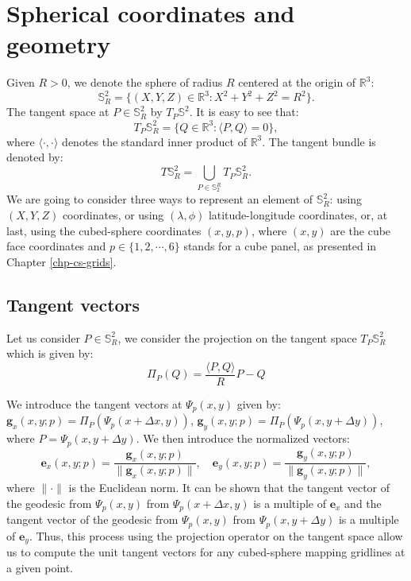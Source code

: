 \chapter{Spherical coordinates and geometry}
\label{anexo-sph}

Given $R>0$, we denote the sphere of radius $R$ 
centered at the origin of  $\mathbb{R}^3$:
\begin{equation*}
	\mathbb{S}^2_R = \{(X,Y,Z) \in \mathbb{R}^3: X^2 + Y^2 + Z^2 = R^2\}.
\end{equation*}
The tangent space at $P \in \mathbb{S}^2_R$ by $T_P \mathbb{S}^2$.
It is easy to see that:
\begin{equation*}
	T_P\mathbb{S}^2_R = \{Q \in \mathbb{R}^3: \langle P,Q\rangle = 0\},
\end{equation*}
where $\langle \cdot, \cdot \rangle$ denotes 
the standard inner product of $\mathbb{R}^3$.
The tangent bundle is denoted by:
\begin{equation*}
T\mathbb{S}_R^2 = \bigcup_{P\in \mathbb{S}^R_2} T_P \mathbb{S}_R^2.
\end{equation*}
We are going to consider three ways to represent an element of $\mathbb{S}_R^2$:
using $(X,Y,Z)$ coordinates, or using $(\lambda, \phi)$
latitude-longitude coordinates, or, at last, using the cubed-sphere
coordinates $(x,y,p)$, where $(x,y)$ are the cube face coordinates and 
$p \in \{1,2,\cdots, 6\}$ stands for a cube panel, as presented in 
Chapter \ref{chp-cs-grids}.

\section{Tangent vectors}
\label{anexo-tangent}
Let us consider $P \in \mathbb{S}_R^2$, we consider the projection
on the tangent space $T_P\mathbb{S}^2_R$ which is given by:
\begin{equation*}
	\Pi_P(Q) = \frac{\langle P, Q \rangle}{R}P - Q
\end{equation*}

We introduce the tangent vectors at $\Psi_p(x,y)$
given by:
$\boldsymbol{g}_x(x,y;p) = \Pi_P(\Psi_p(x+ \Delta x,y))$, 
$\boldsymbol{g}_y(x,y;p) = \Pi_P(\Psi_p(x,y + \Delta y))$,
where $P = \Psi_p(x,y + \Delta y)$.
We then introduce the normalized vectors:
\begin{equation*}
\boldsymbol{e}_x(x,y;p) = 
\frac{\boldsymbol{g}_x(x,y;p)}{\|\boldsymbol{g}_x(x,y;p)\|}, \quad
\boldsymbol{e}_y(x,y;p) = 
\frac{\boldsymbol{g}_y(x,y;p)}{\|\boldsymbol{g}_y(x,y;p)\|},
\end{equation*}
where $\|\cdot\|$ is the Euclidean norm. It can be shown
that the tangent vector of the geodesic from $\Psi_p(x,y)$
from $\Psi_p(x+\Delta x, y)$ is a multiple of $\boldsymbol{e}_x$
and  the tangent vector of the geodesic from $\Psi_p(x,y)$
from $\Psi_p(x, y+\Delta y)$ is a multiple of $\boldsymbol{e}_y$.
Thus, this process using the projection operator on the tangent space
allow us to compute the unit tangent vectors for any cubed-sphere mapping
gridlines at a given point.

